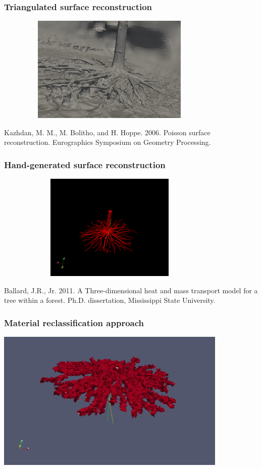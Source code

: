 \documentclass{beamer}
\begin{document}
\begin{frame}
\frametitle{Triangulated surface reconstruction}
\includegraphics[width=4.35in,height=2.0in]{rootsPoissonRecon.png}

Kazhdan, M. M., M. Bolitho, and H. Hoppe. 2006. Poisson surface reconstruction. Eurographics Symposium on Geometry Processing.
\end{frame}

\begin{frame}
\frametitle{Hand-generated surface reconstruction}
\includegraphics[width=4.35in,height=2in]{jerry_orig_root_surface.png}

Ballard, J.R., Jr. 2011. A Three-dimensional heat and mass transport model for a tree within a forest. Ph.D. dissertation, Mississippi State University. 
\end{frame}

\begin{frame}
\frametitle{Material reclassification approach}
\includegraphics[width=4.35in]{root_zone_coarse_1039766_element_a0_001_tol0_333_block_domain.png}
\end{frame}
\end{document}
